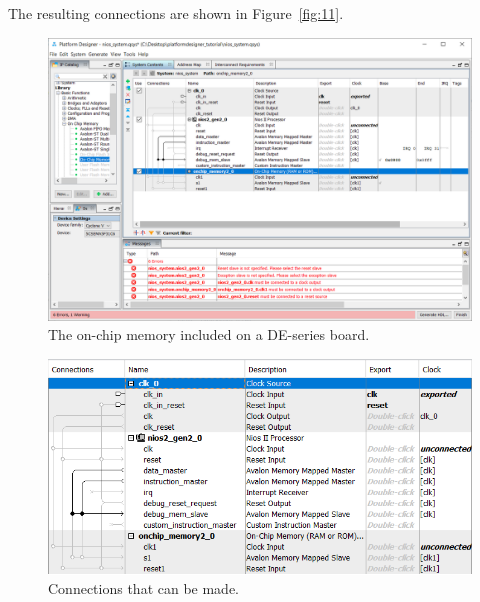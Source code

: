 \documentclass[11pt, twoside, pdftex]{article}
\begin{document}
\begin{enumerate}
The resulting connections are shown in Figure~\ref{fig:11}. 

\begin{figure}[H]
   \begin{center}
      \includegraphics[scale=0.55]{figures/figure9.png}
   \end{center}
   \caption{The on-chip memory included on a DE-series board.} 
	\label{fig:9}
\end{figure}

\begin{figure}[H]
   \begin{center}
      \includegraphics[scale=0.7]{figures/figure10.png}
   \end{center}
   \caption{Connections that can be made.} 
	\label{fig:10}
\end{figure}


\end{enumerate}
\end{document}
